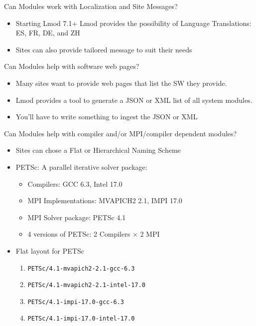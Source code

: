 \documentclass{beamer}
\begin{document}
\begin{frame}{Can Modules work with Localization and Site Messages?}
  \begin{itemize}
    \item Starting Lmod 7.1+ Lmod provides the possibility of Language
      Translations: ES, FR, DE, and ZH
    \item Sites can also provide tailored message to suit their needs
  \end{itemize}
\end{frame}

\begin{frame}{Can Modules help with software web pages?}
  \begin{itemize}
    \item Many sites want to provide web pages that list the SW
      they provide.
    \item Lmod provides a tool to generate a JSON or XML list of all
      system modules.
    \item You'll have to write something to ingest the JSON or XML
  \end{itemize}
\end{frame}

\begin{frame}{Can Modules help with compiler and/or MPI/compiler
      dependent modules?}
  \begin{itemize}
    \item Sites can chose a Flat or Hierarchical Naming Scheme
    \item PETSc: A parallel iterative solver package:
      \begin{itemize}
        \item Compilers: GCC 6.3, Intel 17.0
        \item MPI Implementations: MVAPICH2 2.1, IMPI 17.0
        \item MPI Solver package: PETSc 4.1
        \item 4 versions of PETSc: 2 Compilers $\times$ 2 MPI
      \end{itemize}

    \item Flat layout for PETSc
      \begin{enumerate}
        \item \texttt{PETSc/4.1-mvapich2-2.1-gcc-6.3}
        \item \texttt{PETSc/4.1-mvapich2-2.1-intel-17.0}
        \item \texttt{PETSc/4.1-impi-17.0-gcc-6.3}
        \item \texttt{PETSc/4.1-impi-17.0-intel-17.0}
      \end{enumerate}
  \end{itemize}
\end{frame}
\end{document}
